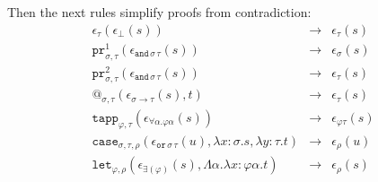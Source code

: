 \documentclass[a4paper,UKenglish,cleveref,autoref,numberwithinsect]{lipics-v2019}
\theoremstyle{definition}
\newcommand{\arrtype}{\rightarrow}
\newcommand{\quant}[2]{\forall #1.#2}
\newcommand{\abs}[2]{\lambda #1.#2}
\newcommand{\tabs}[2]{\Lambda #1.#2}
\newcommand{\red}{\longrightarrow}
\newcommand{\proj}{\mathtt{pr}}
\begin{document}
Then the next rules simplify proofs from contradiction:
\[
\begin{array}{rclrcl}
\epsilon_\tau(\epsilon_\bot(s)) & \red & \epsilon_\tau(s) \\
\proj^1_{\sigma,\tau}(\epsilon_{\mathtt{and}\,\sigma\,\tau}(s)) & \red &
  \epsilon_\sigma(s) \\
\proj^2_{\sigma,\tau}(\epsilon_{\mathtt{and}\,\sigma\,\tau}(s)) & \red &
  \epsilon_\tau(s) \\
@_{\sigma,\tau}(\epsilon_{\sigma \arrtype \tau}(s),t) & \red &
  \epsilon_\tau(s) \\
\mathtt{tapp}_{\varphi,\tau}(
  \epsilon_{\quant{\alpha}{\varphi\alpha}}(s)) & \red &
  \epsilon_{\varphi\tau}(s) \\
\mathtt{case}_{\sigma,\tau,\rho}(\epsilon_{\mathtt{or}\,\sigma\,\tau}(
  u),\abs{x:\sigma}{s},\abs{y:\tau}{t}) & \red & \epsilon_\rho(u) \\
\mathtt{let}_{\varphi,\rho}(\epsilon_{\exists(\varphi)}(s),\tabs{\alpha}{\abs{x:\varphi\alpha}{t}}) & \red &
  \epsilon_\rho(s) \\
\end{array}
\]
\end{document}
